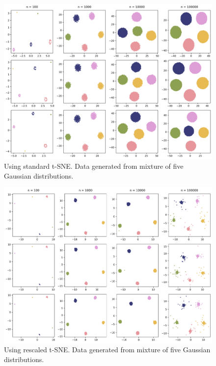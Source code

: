 \begin{figure}[h]
    \centering 
        \includegraphics[width=\linewidth]{figures/rescaled/Gaussian_Mixture_standard_embedding_grid.png}
        \caption{Using standard t-SNE. Data generated from mixture of five Gaussian distributions.}
    \label{fig:Gaussian-standard}
\end{figure}

\begin{figure}[h]
    \centering 
        \includegraphics[width=\linewidth]{figures/rescaled/Gaussian_Mixture_rescaled_embedding_grid.png}
        \caption{Using rescaled t-SNE. Data generated from mixture of five Gaussian distributions.}
    \label{fig:Gaussian-rescaled}
\end{figure}


